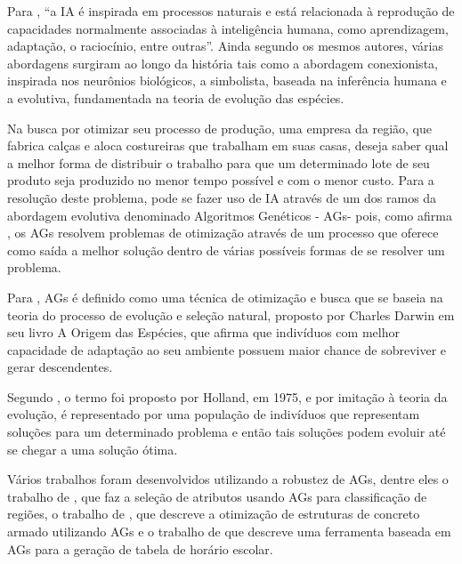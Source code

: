 \par Para , “a IA é inspirada  em  
processos naturais e está relacionada à reprodução de   capacidades  
normalmente   associadas   à   inteligência   humana,   como aprendizagem,
adaptação,   o   raciocínio,   entre   outras”.   Ainda   segundo   os   mesmos
autores,   várias  abordagens   surgiram   ao   longo   da   história   tais   como  
a abordagem   conexionista,   inspirada   nos  neurônios   biológicos,   a  
simbolista, baseada   na   inferência   humana   e   a   evolutiva, fundamentada na teoria
de evolução das espécies.

\par Na busca por otimizar seu processo de produção, uma empresa da região, que
fabrica calças e aloca costureiras que trabalham em suas casas, deseja saber
qual a melhor forma de distribuir o trabalho para que um determinado lote de seu produto
seja produzido no menor tempo possível e com o menor custo. Para a resolução
deste problema, pode se fazer uso de IA através de um dos ramos da abordagem
evolutiva denominado Algoritmos Genéticos - AGs\footnotemark[2] - pois, como
afirma , os AGs resolvem problemas de
otimização através de um processo que oferece como saída a melhor solução
dentro de várias possíveis formas de se resolver um problema.



\par Para , AGs é definido
como uma técnica de otimização e busca que se baseia na teoria do processo de evolução e seleção
natural, proposto por Charles Darwin em seu livro A Origem das Espécies, que
afirma que indivíduos com melhor capacidade de adaptação ao seu ambiente possuem
maior chance de sobreviver e gerar descendentes.

\par Segundo , o termo foi proposto
por Holland, em 1975, e por imitação à teoria da evolução, é representado por
uma população de indivíduos que representam soluções para um determinado problema e então tais soluções
podem evoluir até se chegar a uma solução ótima.

\par Vários trabalhos foram desenvolvidos utilizando a robustez de AGs, dentre
eles o trabalho de , que faz a seleção de
atributos usando AGs para classificação de
regiões, o trabalho de , que descreve a
otimização de estruturas de concreto armado utilizando AGs e 
o trabalho de  que descreve uma ferramenta
baseada em AGs para a geração de tabela de horário escolar.

